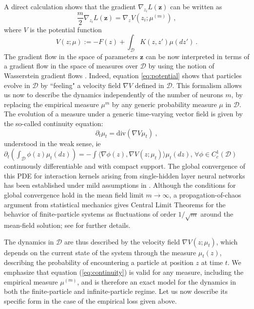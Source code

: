 A direct calculation shows that the gradient $\nabla_{z_i} L(\mathbf{z})$ can be written as 
$$\frac{m}{2} \nabla_{z_i} L(\mathbf{z}) = \nabla_z V(z_i; \mu^{(m)})~,$$%
where $V$ is the potential function 
\begin{equation}
\label{eq:potential}
    V(z;\mu):= -F(z) + \int_\mathcal{D} K(z, z') \mu(dz')~.
\end{equation}
The gradient flow in the space of parameters $\mathbf{z}$ can be now interpreted in terms of a gradient flow in the space of measures over $\mathcal{D}$ by using the notion of Wasserstein gradient flows \cite{meimontanari, chizat2018global, rotskoffeve}. Indeed, 
equation \ref{eq:potential} shows that particles evolve in $\mathcal{D}$ by ``feeling" a velocity field $\nabla V$ defined in $\mathcal{D}$. 
This formalism allows us now to describe the dynamics independently of the number of neurons $m$, by replacing the empirical measure $\mu^m$ 
by any generic probability measure $\mu$ in $\mathcal{D}$. The evolution of a measure under a generic time-varying vector field is given by the 
so-called continuity equation:
\begin{equation}
\label{eq:continuity}
    \partial_t \mu_t = \mathrm{div} ( \nabla V \mu_t)~,
\end{equation}
understood in the weak sense, ie 
$\partial_t \left(\int_\mathcal{D} \phi(z) \mu_t(dz)\right) = - \int \langle \nabla \phi(z), \nabla V(z;\mu_t) \rangle \mu_t(dz)$, 
$\forall \phi \in C^1_c(\mathcal{D})$ continuously differentiable and with compact support. The global 
convergence of this PDE for interaction kernels arising from single-hidden layer neural networks has been 
 established under mild assumptions in \cite{meimontanari, chizat2018global, rotskoffjoan}. Although 
 the conditions for global convergence hold in the mean field limit $m \to \infty$, a propagation-of-chaos 
 argument from statistical mechanics gives Central Limit Theorems for the behavior of finite-particle systems 
 as fluctuations of order $1/\sqrt{m}$ around the mean-field solution; see \cite{rotskoffeve, rotskoffjoan} for further details. 

The dynamics in $\mathcal{D}$ are thus described by the velocity field $\nabla V(z; \mu_t)$, which depends on the current 
state of the system through the measure $\mu_t(z)$, describing the probability of encountering a particle
at position $z$ at time $t$. We emphasize that equation (\ref{eq:continuity}) is valid 
for any measure, including the empirical measure $\mu^{(m)}$, and is therefore an exact model for 
the dynamics in both the finite-particle and infinite-particle
regime. Let us now describe its specific form in the case of the empirical loss given above. 


